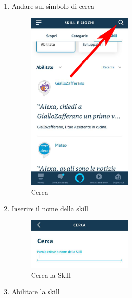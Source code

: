 \begin{itemize}
\begin{enumerate}
	\item Andare sul simbolo di cerca
	\begin{figure}[!ht]
		\centering
		\includegraphics[width=0.5\textwidth]{images/SimboloCerca.png}
		\caption{Cerca}
	\end{figure}
	\item Inserire il nome della skill
	\begin{figure}[!ht]
	\centering
	\includegraphics[width=0.5\textwidth]{images/CercaSkill.png}
	\caption{Cerca la Skill}
   \end{figure}
\newpage
    \item Abilitare la skill 
    

\end{enumerate}
\end{itemize}
